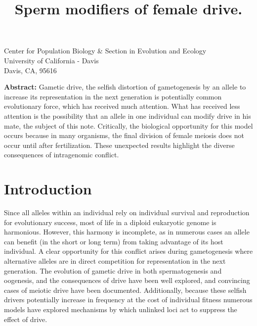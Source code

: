 \documentclass[12pt,letterpaper]{article}
\title{Sperm modifiers of female drive.}
\date{}
\begin{document}
\maketitle
\begin{center}
Center for Population Biology \& Section in Evolution and Ecology \\ University of California - Davis \\ Davis, CA, 95616
\end{center}

\newpage

{\bf Abstract:}
Gametic drive, the selfish distortion of gametogenesis by an allele to increase its representation in the next generation is potentially common evolutionary force, which has received much attention. 
What has received less attention is the possibility that an allele in one individual can modify drive in his mate, the subject of this note.
Critically, the biological opportunity for this model occurs because in many organisms, the final division of female meiosis does not occur until after fertilization.
These unexpected results highlight the diverse consequences of intragenomic conflict.
\newpage

\section*{Introduction}
Since all alleles within an individual rely on individual survival and reproduction for evolutionary success, most of life in a diploid eukaryotic genome is harmonious.
However, this harmony is incomplete, as in numerous cases an allele can benefit (in the short or long term) from taking advantage of its host individual.
A clear opportunity for this conflict arises during gametogenesis where alternative alleles are in direct competition for representation in the next generation.
The evolution of gametic drive in both spermatogenesis and oogenesis, and the consequences of drive have been well explored, and convincing cases of meiotic drive have been documented.
Additionally, because these selfish drivers potentially increase in frequency at the cost of individual fitness numerous models have explored mechanisms by which unlinked loci act to suppress the effect of drive.
\end{document}
